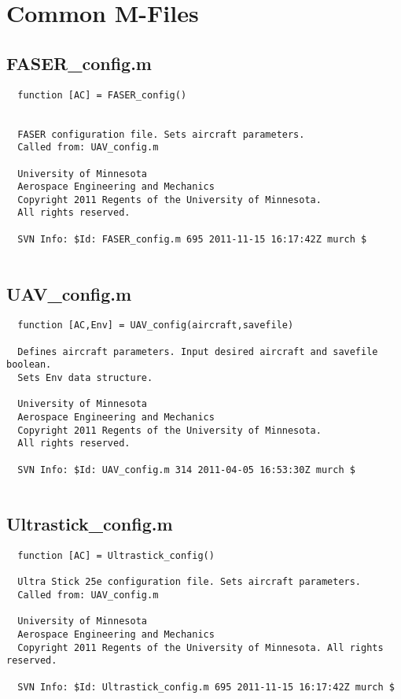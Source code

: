 \documentclass[12pt]{article}
\begin{document}
\section{Common M-Files}
\subsection{FASER\_config.m}
\begin{verbatim}
  function [AC] = FASER_config()
 
 
  FASER configuration file. Sets aircraft parameters.
  Called from: UAV_config.m
 
  University of Minnesota 
  Aerospace Engineering and Mechanics 
  Copyright 2011 Regents of the University of Minnesota. 
  All rights reserved.
 
  SVN Info: $Id: FASER_config.m 695 2011-11-15 16:17:42Z murch $


\end{verbatim}

\subsection{UAV\_config.m}
\begin{verbatim}
  function [AC,Env] = UAV_config(aircraft,savefile)
 
  Defines aircraft parameters. Input desired aircraft and savefile boolean.
  Sets Env data structure.
 
  University of Minnesota 
  Aerospace Engineering and Mechanics 
  Copyright 2011 Regents of the University of Minnesota. 
  All rights reserved.
 
  SVN Info: $Id: UAV_config.m 314 2011-04-05 16:53:30Z murch $


\end{verbatim}

\subsection{Ultrastick\_config.m}
\begin{verbatim}
  function [AC] = Ultrastick_config()
 
  Ultra Stick 25e configuration file. Sets aircraft parameters.
  Called from: UAV_config.m
 
  University of Minnesota 
  Aerospace Engineering and Mechanics 
  Copyright 2011 Regents of the University of Minnesota. All rights reserved.
 
  SVN Info: $Id: Ultrastick_config.m 695 2011-11-15 16:17:42Z murch $


\end{verbatim}
\end{document}
